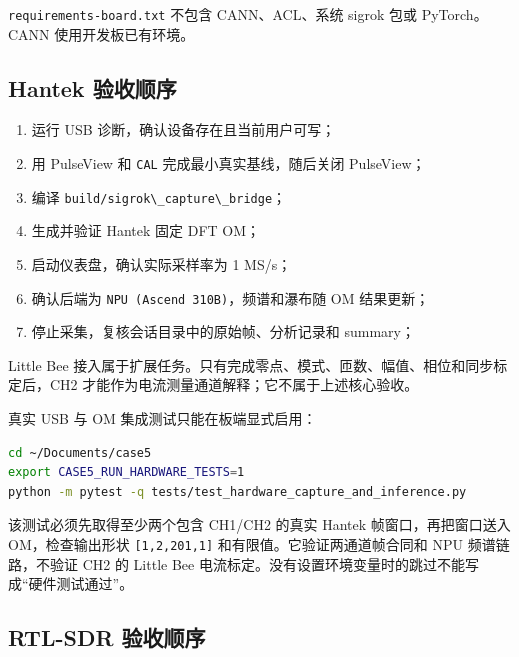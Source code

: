 \passthrough{\lstinline!requirements-board.txt!} 不包含 CANN、ACL、系统
sigrok 包或 PyTorch。CANN 使用开发板已有环境。

\subsection{Hantek
验收顺序}\label{src-experiment-case5-hantek-acceptance}

\begin{enumerate}
\def\labelenumi{\arabic{enumi}.}
\tightlist
\item
  运行 USB 诊断，确认设备存在且当前用户可写；
\item
  用 PulseView 和 \passthrough{\lstinline!CAL!}
  完成最小真实基线，随后关闭 PulseView；
\item
  编译 \passthrough{\lstinline!build/sigrok\_capture\_bridge!}；
\item
  生成并验证 Hantek 固定 DFT OM；
\item
  启动仪表盘，确认实际采样率为 1 MS/s；
\item
  确认后端为 \passthrough{\lstinline!NPU (Ascend 310B)!}，频谱和瀑布随
  OM 结果更新；
\item
  停止采集，复核会话目录中的原始帧、分析记录和 summary；
\end{enumerate}

Little Bee
接入属于扩展任务。只有完成零点、模式、匝数、幅值、相位和同步标定后，CH2
才能作为电流测量通道解释；它不属于上述核心验收。

真实 USB 与 OM 集成测试只能在板端显式启用：

\begin{lstlisting}[language=bash]
cd ~/Documents/case5
export CASE5_RUN_HARDWARE_TESTS=1
python -m pytest -q tests/test_hardware_capture_and_inference.py
\end{lstlisting}

该测试必须先取得至少两个包含 CH1/CH2 的真实 Hantek 帧窗口，再把窗口送入
OM，检查输出形状 \passthrough{\lstinline![1,2,201,1]!}
和有限值。它验证两通道帧合同和 NPU 频谱链路，不验证 CH2 的 Little Bee
电流标定。没有设置环境变量时的跳过不能写成``硬件测试通过''。

\subsection{RTL-SDR 验收顺序}\label{src-experiment-case5-rtl-acceptance}

